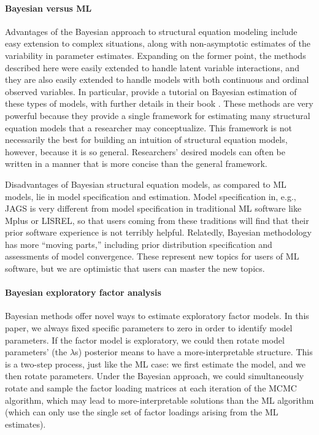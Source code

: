 \paragraph{Bayesian versus ML} Advantages of the Bayesian approach to structural equation modeling include easy extension to complex situations, along with non-asymptotic estimates of the variability in parameter estimates.   Expanding on the former point, the methods described here were easily extended to handle latent variable interactions, and they are also easily extended to handle models with both continuous and ordinal observed variables.  In particular,  provide a tutorial on Bayesian  estimation of these types of models, with further details in their book \cite{sonlee12}.  These methods are very powerful because they provide a single framework for estimating many structural equation models that a researcher may conceptualize.  This framework is not necessarily the best for building an intuition of structural equation models, however, because it is so general.  Researchers' desired models can often be written in a manner that is more concise than the general framework.

Disadvantages of Bayesian structural equation models, as compared to ML models, lie in model specification and estimation.  Model specification in, e.g., JAGS is very different from model specification in traditional ML software like Mplus or LISREL, so that users coming from these traditions will find that their prior software experience is not terribly helpful. Relatedly, Bayesian methodology has more ``moving parts,'' including prior distribution specification and assessments of model convergence.  These represent new topics for users of ML software, but we are optimistic that users can master the new topics.  

\paragraph{Bayesian exploratory factor analysis} Bayesian methods offer novel ways to estimate exploratory factor models.  In this paper, we always fixed specific parameters to zero in order to identify model parameters.  If the factor model is exploratory, we could then rotate model parameters' (the $\lambda$s) posterior means to  have a more-interpretable structure.  This is a two-step process, just like the ML case: we first estimate the model, and we then rotate parameters.  Under the Bayesian approach, we could simultaneously rotate and sample the factor loading matrices at each iteration of the MCMC algorithm, which may lead to more-interpretable solutions than the ML algorithm (which can only use the single set of factor loadings arising from the ML estimates).  

